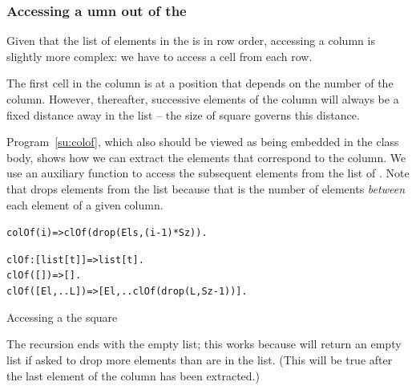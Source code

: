 \subsubsection{Accessing a umn out of the }
Given that the list of elements in the  is in row order, accessing a column is slightly more complex: we have to access a cell from each row. 

The first cell in the column is at a position that depends on the number of the column. However, thereafter, successive elements of the column will always be a fixed distance away in the list -- the size of square governs this distance.

Program~\vref{su:colof}, which also should be viewed as being embedded in the  class body, shows how we can extract the elements that correspond to the column. We use an auxiliary function to access the subsequent elements from the list of . Note that  drops  elements from the list because that is the number of elements \emph{between} each element of a given column.
\begin{program}
\vspace{0.5ex}
\begin{alltt}
colOf(i) => clOf(drop(Els,(i-1)*Sz)).
  
clOf:[list[t]]=>list[t].
clOf([])=>[].
clOf([El,..L]) => [El,..clOf(drop(L,Sz-1))].
\end{alltt}
\vspace{-2ex}
\caption{Accessing a  the square}
\label{su:colof}
\end{program}
\noindent
The  recursion ends with the empty list; this works because  will return an empty list if asked to drop more elements than are in the list. (This will be true after the last element of the column has been extracted.)


